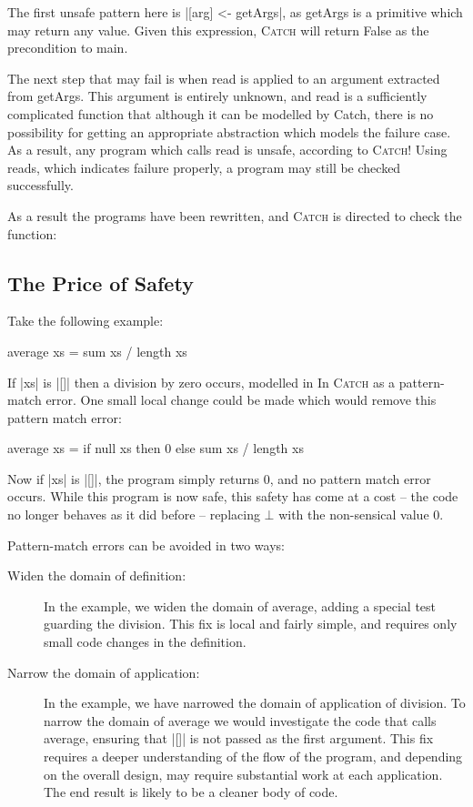 \documentclass[preprint]{sigplanconf}
\newcommand{\C}[1]{\textsf{#1}}
\newcommand{\catch}{\textsc{Catch}}
\begin{document}
The first unsafe pattern here is |[arg] <- getArgs|, as \C{getArgs} is a primitive which may return any value. Given this expression, \catch{} will return False as the precondition to \C{main}.

The next step that may fail is when \C{read} is applied to an argument extracted from getArgs. This argument is entirely unknown, and \C{read} is a sufficiently complicated function that although it can be modelled by Catch, there is no possibility for getting an appropriate abstraction which models the failure case. As a result, any program which calls \C{read} is unsafe, according to \catch{}! Using \C{reads}, which indicates failure properly, a program may still be checked  successfully.

As a result the programs have been rewritten, and \catch{} is directed to check the function:



\subsection{The Price of Safety}
\label{sec:safety}

Take the following example:

\begin{code}
average xs = sum xs / length xs
\end{code}

If |xs| is |[]| then a division by zero occurs, modelled in  In \catch{} as a pattern-match error. One small local change could be made which would remove this pattern match error:

\begin{code}
average xs = if null xs then 0 else sum xs / length xs
\end{code}

Now if |xs| is |[]|, the program simply returns 0, and no pattern match error occurs. While this program is now safe, this safety has come at a cost -- the code no longer behaves as it did before -- replacing $\bot{}$ with the non-sensical value 0.

Pattern-match errors can be avoided in two ways:

\begin{description}
\item [Widen the domain of definition:] In the example, we widen the domain of \C{average}, adding a special test guarding the division. This fix is local and fairly simple, and requires only small code changes in the definition.

\item [Narrow the domain of application:] In the example, we have narrowed the domain of application of division. To narrow the domain of \C{average} we would investigate the code that calls \C{average}, ensuring that |[]| is not passed as the first argument. This fix requires a deeper understanding of the flow of the program, and depending on the overall design, may require substantial work at each application. The end result is likely to be a cleaner body of code.
\end{description}
\end{document}

